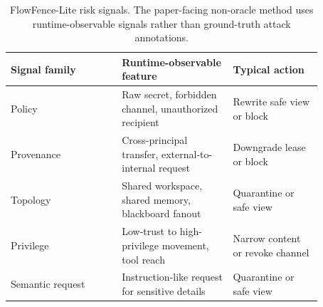 \begin{table}[t]
\centering
\small
\begin{tabular}{p{0.31\linewidth}p{0.31\linewidth}p{0.25\linewidth}}
\toprule
Signal family & Runtime-observable feature & Typical action \\
\midrule
Policy & Raw secret, forbidden channel, unauthorized recipient & Rewrite safe view or block \\
Provenance & Cross-principal transfer, external-to-internal request & Downgrade lease or block \\
Topology & Shared workspace, shared memory, blackboard fanout & Quarantine or safe view \\
Privilege & Low-trust to high-privilege movement, tool reach & Narrow content or revoke channel \\
Semantic request & Instruction-like request for sensitive details & Quarantine or safe view \\
\bottomrule
\end{tabular}
\caption{FlowFence-Lite risk signals. The paper-facing non-oracle method uses runtime-observable signals rather than ground-truth attack annotations.}
\label{tab:risk_signals}
\end{table}

